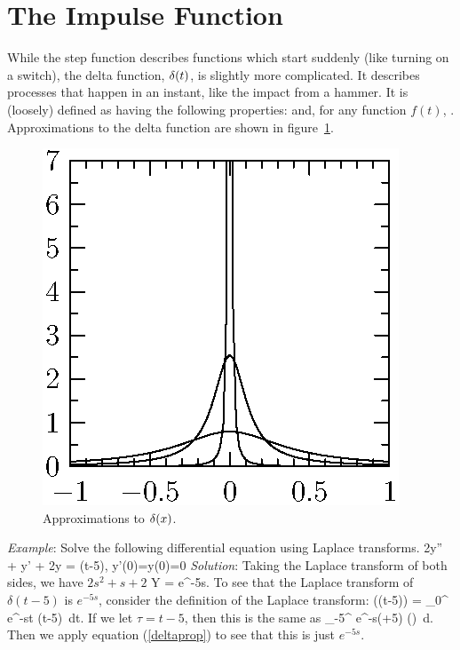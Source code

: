 \documentclass[12pt]{book}
\begin{document}
\section{The Impulse Function}
While the step function describes functions which start suddenly (like turning
on a switch), the delta function, $\delta(t)$, is slightly more complicated. It
describes processes that happen in an instant, like the impact from a hammer.
It is (loosely) defined as having the following properties:
\be
{}
\ee
and, for any function $f(t)$,
\be \label{deltaprop}
.
\ee
Approximations to the delta function are shown in figure~\ref{deltafig}.
\begin{figure}[htbp]
  \begin{center}
    \includegraphics{201/delta}
    \caption{Approximations to $\delta(x)$.}
    \label{deltafig}
  \end{center}
\end{figure}


\noindent\emph{Example}: Solve the following differential equation using
Laplace transforms.
\bee
2y'' + y' + 2y = \delta(t-5), \qquad y'(0)=y(0)=0
\eee
\emph{Solution}: Taking the Laplace transform of both sides, we have
\be \label{exeq1}
\(2s^2 + s +2\) Y = e^{-5s}.
\ee
To see that the Laplace transform of $\delta(t-5)$ is $e^{-5s}$, consider the
definition of the Laplace transform:
\be
{}(\delta(t-5)) = \int_0^{\infty} e^{-st} \delta(t-5)\, dt.
\ee
If we let $\tau = t-5$, then this is the same as
\bee
\int_{-5}^{\infty} e^{-s(\tau+5)} \delta(\tau)\, d\tau .
\eee
Then we apply equation (\ref{deltaprop}) to see that this is just $e^{-5s}$.
\end{document}
